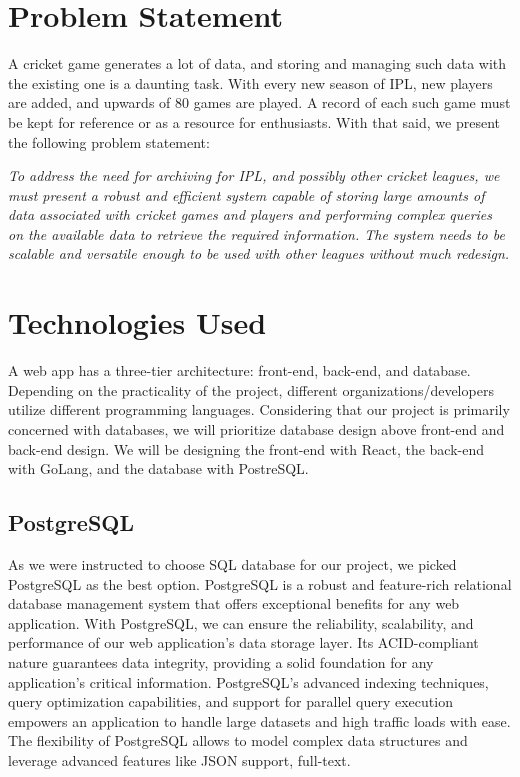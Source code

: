 \documentclass[titlepage]{article}
\begin{document}
\section{Problem Statement}
A cricket game generates a lot of data, and storing and managing such data with the existing one is a daunting task. With every new season of IPL, new players are added, and upwards of 80 games are played. A record of each such game must be kept for reference or as a resource for enthusiasts. With that said, we present the following problem statement:

\noindent
\textit{To address the need for archiving for IPL, and possibly other cricket leagues, we must present a robust and efficient system capable of storing large amounts of data associated with cricket games and players and performing complex queries on the available data to retrieve the required information. The system needs to be scalable and versatile enough to be used with other leagues without much redesign.}

\section{Technologies Used}
A web app has a three-tier architecture: front-end, back-end, and database. Depending on the practicality of the project, different organizations/developers utilize different programming languages. Considering that our project is primarily concerned with databases, we will prioritize database design above front-end and back-end design. We will be designing the front-end with React, the back-end with GoLang, and the database with PostreSQL.

\subsection{PostgreSQL}
As we were instructed to choose SQL database for our project, we picked PostgreSQL as the best option. PostgreSQL is a robust and feature-rich relational database management system that offers exceptional benefits for any web application. With PostgreSQL, we can ensure the reliability, scalability, and performance of our web application's data storage layer. Its ACID-compliant nature guarantees data integrity, providing a solid foundation for any application's critical information. PostgreSQL's advanced indexing techniques, query optimization capabilities, and support for parallel query execution empowers an application to handle large datasets and high traffic loads with ease. The flexibility of PostgreSQL allows to model complex data structures and leverage advanced features like JSON support, full-text.
\end{document}
